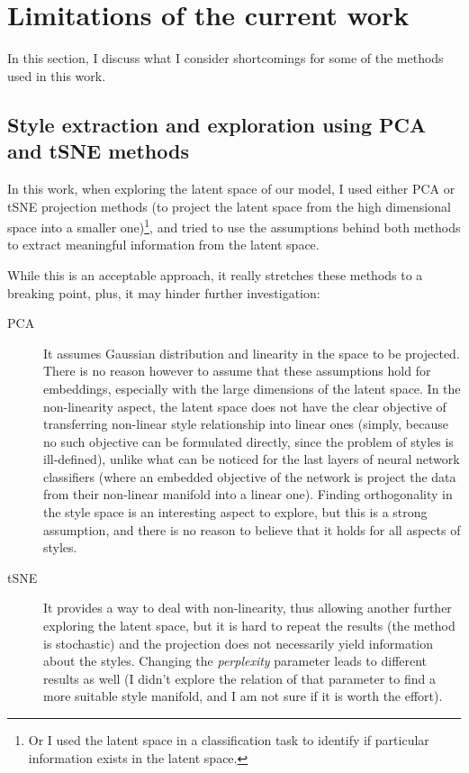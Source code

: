 \section{Limitations of the current work}
  In this section, I discuss what I consider shortcomings for some of the methods used in this work.

  \subsection{Style extraction and exploration using PCA and tSNE methods}
    In this work, when exploring the latent space of our model, I used either PCA or tSNE projection methods (to project the latent space from the high dimensional space into a smaller one)\footnote{Or I used the latent space in a classification task to identify if particular information exists in the latent space.}, and tried to use the assumptions behind both methods to extract meaningful information from the latent space.

    While this is an acceptable approach, it really stretches these methods to a breaking point, plus, it may hinder further investigation:

    \begin{description}
      \item[PCA] It assumes Gaussian distribution and linearity in the space to be projected. There is no reason however to assume that these assumptions hold for embeddings, especially with the large dimensions of the latent space.
      In the non-linearity aspect, the latent space does not have the clear objective of transferring non-linear style relationship into linear ones (simply, because no such objective can be formulated directly, since the problem of styles is ill-defined), unlike what can be noticed for the last layers of neural network classifiers (where an embedded objective of the network is project the data from their non-linear manifold into a linear one). Finding orthogonality in the style space is an interesting aspect to explore, but this is a strong assumption, and there is no reason to believe that it holds for all aspects of styles.
      \item[tSNE] It provides a way to deal with non-linearity, thus allowing another further exploring the latent space, but it is hard to repeat the results (the method is stochastic) and the projection does not necessarily yield information about the styles. Changing the \textit{perplexity} parameter leads to different results as well (I didn't explore the relation of that parameter to find a more suitable style manifold, and I am not sure if it is worth the effort).
    \end{description}

